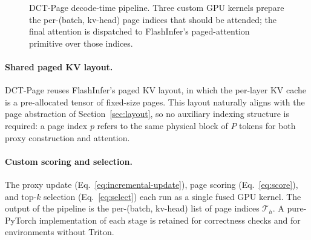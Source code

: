 \begin{figure}[ht]
  \centering
  \caption[Decode-time pipeline composed on top of upstream FlashInfer.]
  {DCT-Page decode-time pipeline.  Three custom GPU kernels prepare
  the per-(batch, kv-head) page indices that should be attended; the
  final attention is dispatched to FlashInfer's paged-attention
  primitive over those indices.}
  \label{fig:pipeline}
\end{figure}

\paragraph{Shared paged KV layout.}
DCT-Page reuses FlashInfer's paged KV layout, in which the per-layer
KV cache is a pre-allocated tensor of fixed-size pages.
This layout naturally aligns with the page abstraction of
Section~\ref{sec:layout}, so no auxiliary indexing structure is
required: a page index $p$ refers to the same physical block of
$P$ tokens for both proxy construction and attention.

\paragraph{Custom scoring and selection.}
The proxy update (Eq.~\eqref{eq:incremental-update}), page scoring
(Eq.~\eqref{eq:score}), and top-$k$ selection (Eq.~\eqref{eq:select})
each run as a single fused GPU kernel.  The output of the pipeline is
the per-(batch, kv-head) list of page indices $\mathcal{T}_h$.
A pure-PyTorch implementation of each stage is retained for
correctness checks and for environments without Triton.

